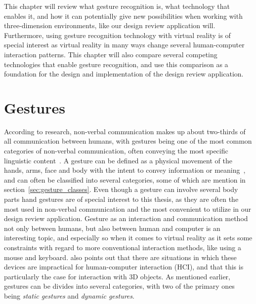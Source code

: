 This chapter will review what gesture recognition is, what technology that enables it, and how it can potentially give new possibilities when working
with three-dimension environments, like our design review application will. Furthermore, using gesture recognition technology with virtual reality is 
of special interest as virtual reality in many ways change several human-computer interaction patterns. This chapter will also compare several competing 
technologies that enable gesture recognition, and use this comparison as a foundation for the design and implementation of the design review application.  

\section{Gestures}
According to research, non-verbal communication makes up about two-thirds of all communication between humans, with gestures being one of the most common 
categories of non-verbal communication, often conveying the most specific linguistic content~\citep{Hogan2003}.
A gesture can be defined as a physical movement of the hands, arms, face and body with the intent to convey information or meaning~\citep{Mitra2007}, 
and can often be classified into several categories, some of which are mention in section~\vref{sec:gesture_classes}. Even though 
a gesture can involve several body parts hand gestures are of special interest to this thesis, as they are often the most used in non-verbal communication
and the most convenient to utilize in our design review application. 
Gesture as an interaction and communication method not only between humans, but also between human and computer is an interesting topic, 
and especially so when it comes to virtual reality as it sets some constraints with regard to more conventional interaction methods, like using 
a mouse and keyboard. \citet{Rautaray2015} also points out that there are situations in which
these devices are impractical for human-computer interaction (HCI), and that this is particularly the case for interaction with 3D objects.
As mentioned earlier, gestures can be divides into several categories, with two of the primary ones being \textit{static gestures} and \textit{dynamic gestures}.


